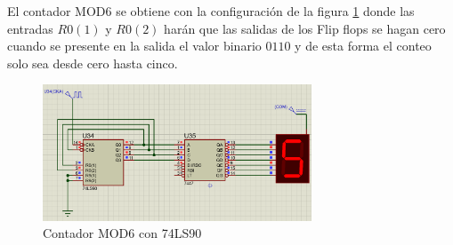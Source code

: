 El contador MOD6 se obtiene con la configuración de la figura \ref{cont_MOD6} donde las entradas $R0(1)$ y $R0(2)$ harán que las salidas de los Flip flops se hagan cero cuando se presente en la salida el valor binario $0110$ y de esta forma el conteo solo sea desde cero hasta cinco.
\newline
\begin{figure}[h]
    \begin{center}
    \includegraphics[width=8cm]{images/image5.png}
    \newline
    \caption{Contador MOD6 con 74LS90}\label{cont_MOD6}
    \end{center}
\end{figure}
\newline
